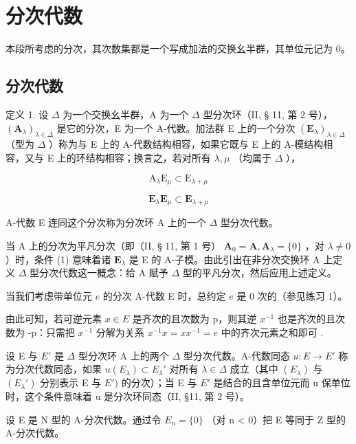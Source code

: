 \section{分次代数}

本段所考虑的分次，其次数集都是一个写成加法的交换幺半群，其单位元记为 0。

\subsection{分次代数}

定义 1. 设 \(\Delta\) 为一个交换幺半群，A 为一个 \(\Delta\) 型分次环（II, § 11, 第 2 号）， \((\mathbf{A}_{\lambda})_{\lambda \in \Delta}\) 是它的分次，E 为一个 A-代数。加法群 E 上的一个分次 \((\mathbf{E}_{\lambda})_{\lambda \in \Delta}\) （型为 \(\Delta\) ）称为与 E 上的 A-代数结构相容，如果它既与 E 上的 A-模结构相容，又与 E 上的环结构相容；换言之，若对所有 \(\lambda, \mu\) （均属于 \(\Delta\) ），

\[
\mathrm{A} _ {\lambda} \mathrm{E} _ {\mu} \subset \mathrm{E} _ {\lambda + \mu}\tag{1}
\]

\[
\mathbf {E} _ {\lambda} \mathbf {E} _ {\mu} \subset \mathbf {E} _ {\lambda + \mu}\tag{2}
\]

A-代数 E 连同这个分次称为分次环 A 上的一个 \(\Delta\) 型分次代数。

当 A 上的分次为平凡分次（即（II, § 11, 第 1 号） \(\mathbf{A}_0 = \mathbf{A}, \mathbf{A}_{\lambda} = \{0\}\) ，对 \(\lambda \neq 0\) ）时，条件 (1) 意味着诸 \(\mathbf{E}_{\lambda}\) 是 E 的 A-子模。由此引出在非分次交换环 A 上定义 \(\Delta\) 型分次代数这一概念：给 A 赋予 \(\Delta\) 型的平凡分次，然后应用上述定义。

当我们考虑带单位元 \(e\) 的分次 A-代数 E 时，总约定 \(e\) 是 0 次的（参见练习 1）。

由此可知，若可逆元素 \(x \in E\) 是齐次的且次数为 p，则其逆 \(x^{-1}\) 也是齐次的且次数为 -p：只需把 \(x^{-1}\) 分解为关系 \(x^{-1}x = xx^{-1} = e\) 中的齐次元素之和即可 .

设 E 与 \(E'\) 是 \(\Delta\) 型分次环 A 上的两个 \(\Delta\) 型分次代数。A-代数同态 \(u: E \to E'\) 称为分次代数同态，如果 \(u(E_{\lambda}) \subset E_{\lambda}'\) 对所有 \(\lambda \in \Delta\) 成立（其中 \((E_{\lambda})\) 与 \((E_{\lambda}')\) 分别表示 E 与 \(E')\) 的分次）；当 E 与 \(E'\) 是结合的且含单位元而 u 保单位时，这个条件意味着 u 是分次环同态（II, §11, 第 2 号）。

设 E 是 N 型的 A-分次代数。通过令 \(E_{n} = \{0\}\) （对 n \textless{} 0）把 E 等同于 Z 型的 A-分次代数。

